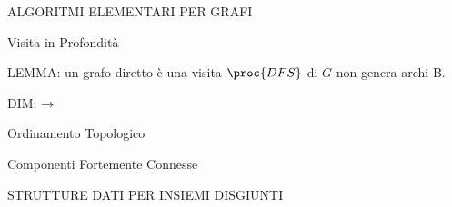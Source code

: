 \documentclass[8pt]{extarticle}
\begin{document}
\begin{formulario}
\begin{myParagraph}{ALGORITMI ELEMENTARI PER GRAFI}
\begin{subParagraph}{Visita in Profondità}
\begin{Descr}
				\begin{Descr} 
					\item[LEMMA:] un grafo diretto è  \SSE una visita $\proc{DFS}$ di $G$ non genera archi B.
					\item[DIM:] $\rightarrow$
				\end{Descr}
			\end{Descr}
		\end{subParagraph}
		\begin{subParagraph}{Ordinamento Topologico}
		\end{subParagraph}
		\begin{subParagraph}{Componenti Fortemente Connesse}
		\end{subParagraph}
	
	
	
	
	
	
	
	
	
	
	
	
	
	
	
	
	
	
	
	
	
	
	
	
	
	
	
	\end{myParagraph}
	\begin{myParagraph}{STRUTTURE DATI PER INSIEMI DISGIUNTI}
	\end{myParagraph}
\end{formulario}
\end{document}
